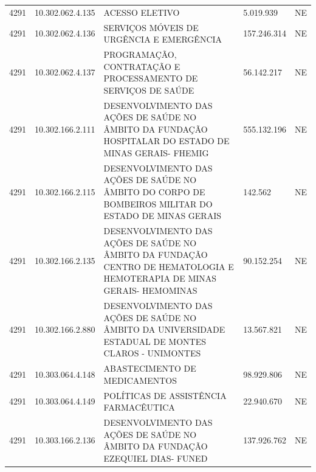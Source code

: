 \documentclass{article}
\begin{document}
\begin{longtable}[c]{m{1cm}|m{2cm}|m{10cm}|m{2cm}|m{1cm}}
\multicolumn{1}{C{1cm}|}{4291} & \multicolumn{1}{C{2cm}|}{10.302.062.4.135} & \multicolumn{1}{L{10cm}|}{ACESSO ELETIVO} & \multicolumn{1}{R{2cm}|}{5.019.939} & \multicolumn{1}{C{1cm}}{NE} \\
\multicolumn{1}{C{1cm}|}{4291} & \multicolumn{1}{C{2cm}|}{10.302.062.4.136} & \multicolumn{1}{L{10cm}|}{SERVIÇOS MÓVEIS DE URGÊNCIA E EMERGÊNCIA} & \multicolumn{1}{R{2cm}|}{157.246.314} & \multicolumn{1}{C{1cm}}{NE} \\
\multicolumn{1}{C{1cm}|}{4291} & \multicolumn{1}{C{2cm}|}{10.302.062.4.137} & \multicolumn{1}{L{10cm}|}{PROGRAMAÇÃO, CONTRATAÇÃO E PROCESSAMENTO DE SERVIÇOS DE SAÚDE} & \multicolumn{1}{R{2cm}|}{56.142.217} & \multicolumn{1}{C{1cm}}{NE} \\
\multicolumn{1}{C{1cm}|}{4291} & \multicolumn{1}{C{2cm}|}{10.302.166.2.111} & \multicolumn{1}{L{10cm}|}{DESENVOLVIMENTO DAS AÇÕES DE SAÚDE NO ÂMBITO DA FUNDAÇÃO HOSPITALAR DO ESTADO DE MINAS GERAIS- FHEMIG} & \multicolumn{1}{R{2cm}|}{555.132.196} & \multicolumn{1}{C{1cm}}{NE} \\
\multicolumn{1}{C{1cm}|}{4291} & \multicolumn{1}{C{2cm}|}{10.302.166.2.115} & \multicolumn{1}{L{10cm}|}{DESENVOLVIMENTO DAS AÇÕES DE SAÚDE NO ÂMBITO DO CORPO DE BOMBEIROS MILITAR DO ESTADO DE MINAS GERAIS} & \multicolumn{1}{R{2cm}|}{142.562} & \multicolumn{1}{C{1cm}}{NE} \\
\multicolumn{1}{C{1cm}|}{4291} & \multicolumn{1}{C{2cm}|}{10.302.166.2.135} & \multicolumn{1}{L{10cm}|}{DESENVOLVIMENTO DAS AÇÕES DE SAÚDE NO ÂMBITO DA FUNDAÇÃO CENTRO DE HEMATOLOGIA E HEMOTERAPIA DE MINAS GERAIS- HEMOMINAS} & \multicolumn{1}{R{2cm}|}{90.152.254} & \multicolumn{1}{C{1cm}}{NE} \\
\multicolumn{1}{C{1cm}|}{4291} & \multicolumn{1}{C{2cm}|}{10.302.166.2.880} & \multicolumn{1}{L{10cm}|}{DESENVOLVIMENTO DAS AÇÕES DE SAÚDE NO ÂMBITO DA UNIVERSIDADE ESTADUAL DE MONTES CLAROS - UNIMONTES} & \multicolumn{1}{R{2cm}|}{13.567.821} & \multicolumn{1}{C{1cm}}{NE} \\
\multicolumn{1}{C{1cm}|}{4291} & \multicolumn{1}{C{2cm}|}{10.303.064.4.148} & \multicolumn{1}{L{10cm}|}{ABASTECIMENTO DE MEDICAMENTOS} & \multicolumn{1}{R{2cm}|}{98.929.806} & \multicolumn{1}{C{1cm}}{NE} \\
\multicolumn{1}{C{1cm}|}{4291} & \multicolumn{1}{C{2cm}|}{10.303.064.4.149} & \multicolumn{1}{L{10cm}|}{POLÍTICAS DE ASSISTÊNCIA FARMACÊUTICA} & \multicolumn{1}{R{2cm}|}{22.940.670} & \multicolumn{1}{C{1cm}}{NE} \\
\multicolumn{1}{C{1cm}|}{4291} & \multicolumn{1}{C{2cm}|}{10.303.166.2.136} & \multicolumn{1}{L{10cm}|}{DESENVOLVIMENTO DAS AÇÕES DE SAÚDE NO ÂMBITO DA FUNDAÇÃO EZEQUIEL DIAS- FUNED} & \multicolumn{1}{R{2cm}|}{137.926.762} & \multicolumn{1}{C{1cm}}{NE} \\

\end{longtable}
\end{document}
